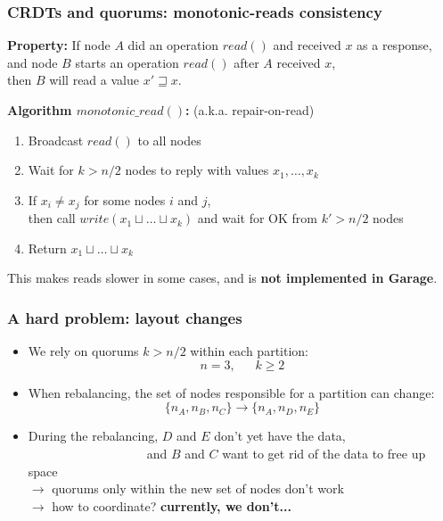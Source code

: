 \documentclass[aspectratio=169]{beamer}
\begin{document}
\begin{frame}
	\frametitle{CRDTs and quorums: monotonic-reads consistency}
	\textbf{Property:} If node $A$ did an operation $read()$ and received $x$ as a response,\\
		\hspace{2cm} and node $B$ starts an operation $read()$ after $A$ received $x$,\\
		\hspace{2cm} then $B$ will read a value $x' \sqsupseteq x$.

	\vspace{1em}

	\textbf{Algorithm $monotonic\_read()$:} {\small (a.k.a. repair-on-read)}
	\begin{enumerate}
		\item Broadcast $read()$ to all nodes
		\item Wait for $k > n/2$ nodes to reply with values $x_1, \dots, x_k$
		\item If $x_i \ne x_j$ for some nodes $i$ and $j$,\\
			\hspace{1cm}then call $write(x_1 \sqcup \dots \sqcup x_k)$ and wait for OK from $k' > n/2$ nodes
		\item Return $x_1 \sqcup \dots \sqcup x_k$
	\end{enumerate}

	\vspace{1em}

	This makes reads slower in some cases, and is \textbf{not implemented in Garage}.
\end{frame}

\begin{frame}
	\frametitle{A hard problem: layout changes}
	\begin{itemize}
		\item We rely on quorums $k > n/2$ within each partition:\\
			$$n=3,~~~~~~~k\ge 2$$
		\item<2-> When rebalancing, the set of nodes responsible for a partition can change:\\
			$$\{n_A, n_B, n_C\} \to \{n_A, n_D, n_E\}$$
			\vspace{.01em}
		\item<3-> During the rebalancing, $D$ and $E$ don't yet have the data,\\
			~~~~~~~~~~~~~~~~~~~and $B$ and $C$ want to get rid of the data to free up space\\
			\vspace{.2em}
			$\to$ quorums only within the new set of nodes don't work\\
			$\to$ how to coordinate? \textbf{currently, we don't...}

	\end{itemize}
\end{frame}
\end{document}
